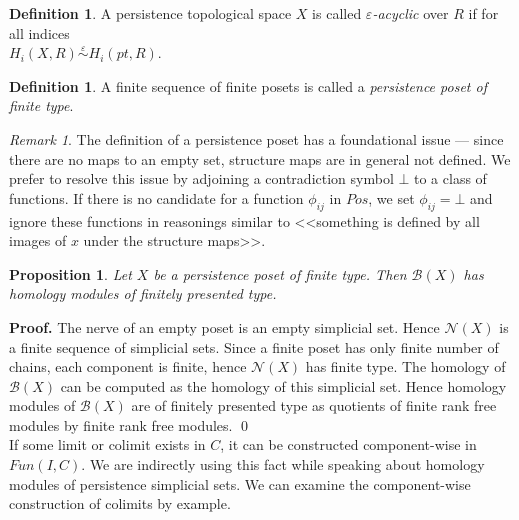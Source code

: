 \documentclass[english,12pt]{article}
\newcounter{stmcounter}[section]
\numberwithin{equation}{section}
\newtheorem{proposition}[stmcounter]{Proposition}
\theoremstyle{definition}
\newtheorem{definition}[stmcounter]{Definition}
\theoremstyle{remark}
\newtheorem{remark}[stmcounter]{Remark}
\newenvironment{pf}{\noindent\textbf{Proof.}}{\qed}
\newcommand{\define}[1]{{\textit{#1}}}
\begin{document}
\begin{definition}
  A persistence topological space $X$ is called \define{$\varepsilon$-acyclic} over $R$ if for all indices\\ $H_i(X,R) \stackrel{\varepsilon}{\sim} H_i(pt,R)$.
\end{definition}

\begin{definition}
  A finite sequence of finite posets is called a \define{persistence poset of finite type}.
\end{definition}

\begin{remark}
  The definition of a persistence poset has a foundational issue --- since there are no maps to an empty set, structure maps are in general not defined. We prefer to resolve this issue by adjoining a contradiction symbol $\bot$ to a class of functions. If there is no candidate for a function $\phi_{ij}$ in $Pos$, we set $\phi_{ij} = \bot$ and ignore these functions in reasonings similar to <<something is defined by all images of $x$ under the structure maps>>.
\end{remark}

\begin{proposition}
  Let $X$ be a persistence poset of finite type. Then $\mathcal{B}(X)$ has homology modules of finitely presented type.
\end{proposition}

\begin{pf}
  The nerve of an empty poset is an empty simplicial set. Hence $\mathcal{N}(X)$ is a finite sequence of simplicial sets. Since a finite poset has only finite number of chains, each component is finite, hence $\mathcal{N}(X)$ has finite type. The homology of $\mathcal{B}(X)$ can be computed as the homology of this simplicial set. Hence homology modules of $\mathcal{B}(X)$ are of finitely presented type as quotients of finite rank free modules by finite rank free modules.
\end{pf}\\

If some limit or colimit exists in $C$, it can be constructed component-wise in $Fun(I,C)$. We are indirectly using this fact while speaking about homology modules of persistence simplicial sets. We can examine the component-wise construction of colimits by example.\\
\end{document}
